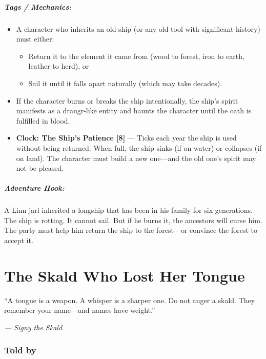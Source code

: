 \documentclass[9pt,a5paper]{extbook}
\begin{document}
\paragraph{Tags / Mechanics:}
\begin{itemize}
    \item A character who inherits an old ship (or any old tool with significant history) must either:
    \begin{itemize}
        \item Return it to the element it came from (wood to forest, iron to earth, leather to herd), or
        \item Sail it until it falls apart naturally (which may take decades).
    \end{itemize}
    \item If the character burns or breaks the ship intentionally, the ship's spirit manifests as a draugr-like entity and haunts the character until the oath is fulfilled in blood.
    \item \textbf{Clock: The Ship's Patience [8]} --- Ticks each year the ship is used without being returned. When full, the ship sinks (if on water) or collapses (if on land). The character must build a new one---and the old one's spirit may not be pleased.
\end{itemize}

\paragraph{Adventure Hook:}
A Linn jarl inherited a longship that has been in his family for six generations. The ship is rotting. It cannot sail. But if he burns it, the ancestors will curse him. The party must help him return the ship to the forest---or convince the forest to accept it.

\clearpage

\chapter{The Skald Who Lost Her Tongue}

\epigraph{``A tongue is a weapon. A whisper is a sharper one. Do not anger a skald. They remember your name---and names have weight.''}{\textit{--- Signy the Skald}}

\subsection*{Told by}
\end{document}
